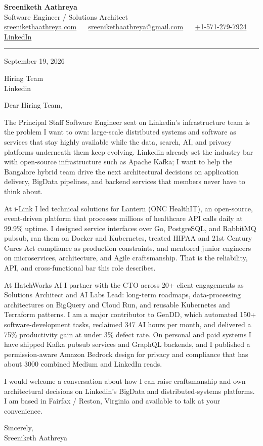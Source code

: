 \documentclass[11pt, letterpaper]{article}
\begin{document}
{\fontsize{18 pt}{20 pt}\selectfont\bfseries Sreeniketh Aathreya}\\[4pt]
Software Engineer / Solutions Architect\\[6pt]
\href{https://sreenikethaathreya.com}{sreenikethaathreya.com}
~\textbullet~
\href{mailto:sreenikethaathreya@gmail.com}{sreenikethaathreya@gmail.com}
~\textbullet~
\href{tel:+1-571-279-7924}{+1-571-279-7924}
~\textbullet~
\href{https://www.linkedin.com/in/sreeniketh-aathreya-16800b122/}{LinkedIn}

\vspace{12pt}
\hrule
\vspace{12pt}

September 19, 2026

\vspace{8pt}

Hiring Team\\
Linkedin

\vspace{12pt}

Dear Hiring Team,

The Principal Staff Software Engineer seat on Linkedin's infrastructure team is the problem I want to own: large-scale distributed systems and software as services that stay highly available while the data, search, AI, and privacy platforms underneath them keep evolving. Linkedin already set the industry bar with open-source infrastructure such as Apache Kafka; I want to help the Bangalore hybrid team drive the next architectural decisions on application delivery, BigData pipelines, and backend services that members never have to think about.

At i-Link I led technical solutions for Lantern (ONC HealthIT), an open-source, event-driven platform that processes millions of healthcare API calls daily at 99.9\% uptime. I designed service interfaces over Go, PostgreSQL, and RabbitMQ pubsub, ran them on Docker and Kubernetes, treated HIPAA and 21st Century Cures Act compliance as production constraints, and mentored junior engineers on microservices, architecture, and Agile craftsmanship. That is the reliability, API, and cross-functional bar this role describes.

At HatchWorks AI I partner with the CTO across 20+ client engagements as Solutions Architect and AI Labs Lead: long-term roadmaps, data-processing architectures on BigQuery and Cloud Run, and reusable Kubernetes and Terraform patterns. I am a major contributor to GenDD, which automated 150+ software-development tasks, reclaimed 347 AI hours per month, and delivered a 75\% productivity gain at under 3\% defect rate. On personal and paid systems I have shipped Kafka pubsub services and GraphQL backends, and I published a permission-aware Amazon Bedrock design for privacy and compliance that has about 3000 combined Medium and LinkedIn reads.

I would welcome a conversation about how I can raise craftsmanship and own architectural decisions on Linkedin's BigData and distributed-systems platforms. I am based in Fairfax / Reston, Virginia and available to talk at your convenience.

Sincerely,\\[12pt]
Sreeniketh Aathreya
\end{document}
